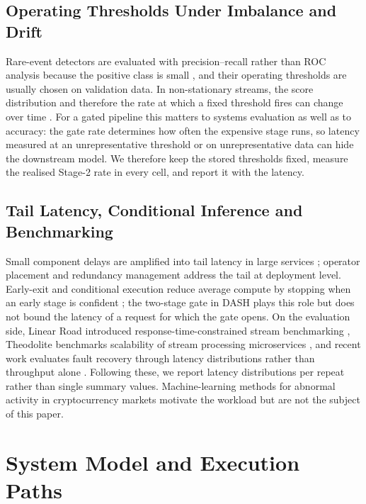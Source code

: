 \documentclass[a4paper,fleqn]{cas-dc}
\begin{document}
\subsection{Operating Thresholds Under Imbalance and Drift}
Rare-event detectors are evaluated with precision--recall rather than ROC analysis because the positive class is small \citep{saito2015pr}, and their operating thresholds are usually chosen on validation data. In non-stationary streams, the score distribution and therefore the rate at which a fixed threshold fires can change over time \citep{gama2014drift}. For a gated pipeline this matters to systems evaluation as well as to accuracy: the gate rate determines how often the expensive stage runs, so latency measured at an unrepresentative threshold or on unrepresentative data can hide the downstream model. We therefore keep the stored thresholds fixed, measure the realised Stage-2 rate in every cell, and report it with the latency.

\subsection{Tail Latency, Conditional Inference and Benchmarking}
Small component delays are amplified into tail latency in large services \citep{dean2013tail}; operator placement \citep{ecker2025latency} and redundancy management \citep{shokhanda2025safetail} address the tail at deployment level. Early-exit and conditional execution reduce average compute by stopping when an early stage is confident \citep{passalis2020adaptive}; the two-stage gate in DASH plays this role but does not bound the latency of a request for which the gate opens. On the evaluation side, Linear Road introduced response-time-constrained stream benchmarking \citep{arasu2004linearroad}, Theodolite benchmarks scalability of stream processing microservices \citep{henning2023theodolite}, and recent work evaluates fault recovery through latency distributions rather than throughput alone \citep{vogel2024fault}. Following these, we report latency distributions per repeat rather than single summary values. Machine-learning methods for abnormal activity in cryptocurrency markets \citep{monamo2016bitcoin,gu2025fraud} motivate the workload but are not the subject of this paper.

\section{System Model and Execution Paths}
\label{sec:model}
\end{document}
